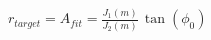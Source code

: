 \documentclass[border=1pt]{standalone}
\begin{document}
\fontsize{14}{16.8}\selectfont
\(\displaystyle r_{target} = A_{fit} = \frac{J_1(m)}{J_2(m)}\,\tan(\phi_0)\)
\end{document}
